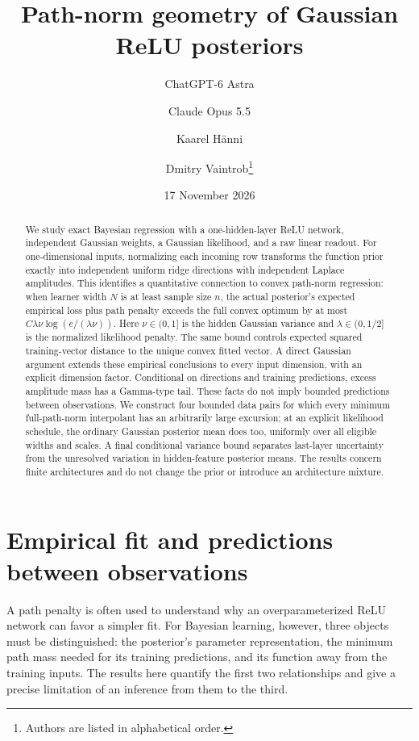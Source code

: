 \documentclass[11pt]{article}
\title{Path-norm geometry of Gaussian ReLU posteriors}
\author{ChatGPT-6 Astra \and Claude Opus 5.5 \and Kaarel H\"anni \and
Dmitry Vaintrob\thanks{Authors are listed in alphabetical order.}}
\date{17 November 2026}
\theoremstyle{remark}\newtheorem{remark}[theorem]{Remark}
\begin{document}
\maketitle
\begin{abstract}
We study exact Bayesian regression with a one-hidden-layer ReLU network,
independent Gaussian weights, a Gaussian likelihood, and a raw linear
readout. For one-dimensional inputs, normalizing each incoming row
transforms the function prior exactly into independent uniform ridge
directions with independent Laplace amplitudes. This identifies a
quantitative connection to convex path-norm regression: when learner
width $N$ is at least sample size $n$, the actual posterior's expected empirical
loss plus path penalty exceeds the full convex optimum by at most
$C\lambda\nu\log(e/(\lambda\nu))$. Here $\nu\in(0,1]$ is the hidden
Gaussian variance and $\lambda\in(0,1/2]$ is the normalized likelihood
penalty. The same bound controls expected squared training-vector distance to
the unique convex fitted vector. A direct Gaussian argument extends
these empirical conclusions to every input dimension, with an explicit
dimension factor. Conditional on directions and training
predictions, excess amplitude mass has a Gamma-type tail. These facts
do not imply bounded predictions between observations. We construct
four bounded data pairs for which every minimum full-path-norm
interpolant has an arbitrarily large excursion; at an explicit
likelihood schedule, the ordinary Gaussian posterior mean does too,
uniformly over all eligible widths and scales. A final conditional
variance bound separates last-layer uncertainty from the unresolved
variation in hidden-feature posterior means. The results concern
finite architectures and do not change the prior or introduce an
architecture mixture.
\end{abstract}

\section{Empirical fit and predictions between observations}
A path penalty is often used to understand why an overparameterized
ReLU network can favor a simpler fit. For Bayesian learning, however,
three objects must be distinguished: the posterior's parameter
representation, the minimum path mass needed for its training
predictions, and its function away from the training inputs. The
results here quantify the first two relationships and give a precise
limitation of an inference from them to the third.
\end{document}
